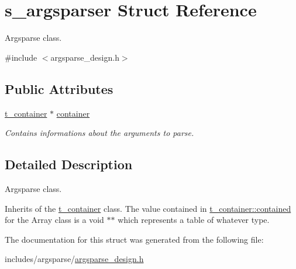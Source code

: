 \hypertarget{structs__argsparser}{}\section{s\+\_\+argsparser Struct Reference}
\label{structs__argsparser}


Argsparse class.  




{\ttfamily \#include $<$argsparse\+\_\+design.\+h$>$}

\subsection*{Public Attributes}
\begin{DoxyCompactItemize}
\item 
\hyperlink{container__design_8h_a2baa2855e4617ebc7ad317f13fda1cbe}{t\+\_\+container} $\ast$ \hyperlink{structs__argsparser_aa6287434b6596f4c9ab88f2ece64c728}{container}\hypertarget{structs__argsparser_aa6287434b6596f4c9ab88f2ece64c728}{}\label{structs__argsparser_aa6287434b6596f4c9ab88f2ece64c728}

\begin{DoxyCompactList}\small\item\em Contains informations about the arguments to parse. \end{DoxyCompactList}\end{DoxyCompactItemize}


\subsection{Detailed Description}
Argsparse class. 

Inherits of the \hyperlink{container__design_8h_a2baa2855e4617ebc7ad317f13fda1cbe}{t\+\_\+container} class. The value contained in \hyperlink{structs__container_a46a37b6427c9569f29422c515529a48b}{t\+\_\+container\+::contained} for the Array class is a void $\ast$$\ast$ which represents a table of whatever type. 

The documentation for this struct was generated from the following file\+:\begin{DoxyCompactItemize}
\item 
includes/argsparse/\hyperlink{argsparse__design_8h}{argsparse\+\_\+design.\+h}\end{DoxyCompactItemize}

